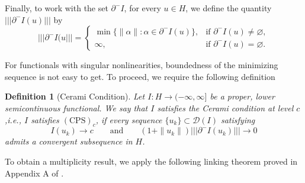 \documentclass[11pt]{article}
\newtheorem{definition}{Definition}[section] %
\newcommand{\tnorm}[1]{\left|\!\left|\!\left| #1 \right|\!\right|\!\right|}
\begin{document}
Finally, to work with the set $\partial^{-} I$, for every $u \in H$, we define the quantity $\tnorm{\partial^{-} I(u)}$ by
\begin{equation*}
\tnorm{\partial^{-} I(u}
=
\begin{cases}
\displaystyle
\min \{ \|\alpha\| : \alpha \in \partial^{-} I(u) \},
& \text{if } \partial^{-} I(u) \neq \varnothing, \\[1ex]
\infty,
& \text{if } \partial^{-} I(u) = \varnothing .
\end{cases}
\end{equation*}

For functionals with singular nonlinearities, boundedness of the minimizing sequence is not easy to get. To proceed, we require the following definition
\begin{definition}[Cerami Condition]
Let $I : H \to (-\infty, \infty]$ be a proper, lower semicontinuous functional. We say that $I$ satisfies the Cerami condition at level $c$,i.e., $I$ satisfies $(\mathrm{CPS})_c$, if every sequence $\{u_k\} \subset \mathcal{D}(I)$ satisfying
\begin{equation*}
I(u_k) \to c
\qquad \text{and} \qquad
\left( 1 + \|u_k\| \right)
\tnorm{\partial^- I(u_k)} \to 0
\end{equation*}
admits a convergent subsequence in $H$.    
\end{definition}

To obtain a multiplicity result, we apply the following linking theorem proved in Appendix A of \cite{hirano_fully_singular}. 
 
\end{document}
